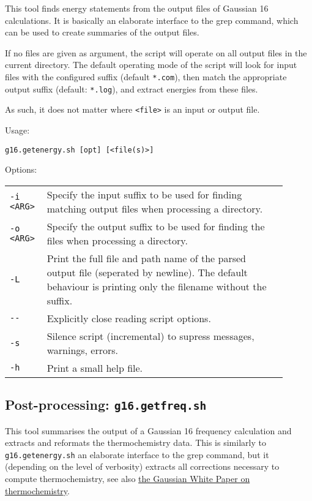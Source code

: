 \documentclass[   %
  final,          %
  a4paper         %
]{article}
\begin{document}
This tool finds energy statements from the output files of Gaussian 16 calculations.
It is basically an elaborate interface to the grep command, 
which can be used to create summaries of the output files.

If no files are given as argument, the script will operate on all output files in the current directory.
The default operating mode of the script will look for input files with the configured suffix (default \texttt{*.com}),
then match the appropriate output suffix (default: \texttt{*.log}),
and extract energies from these files.

As such, it does not matter where \lstinline`<file>` is an input or output file.

Usage: 

\lstinline`g16.getenergy.sh [opt] [<file(s)>]`

Options: 

\begin{tabular}{p{0.1\linewidth}p{0.8\linewidth}}
  {\lstinline`-i <ARG>`} & Specify the input suffix to be used for finding matching output files when processing a directory. \\
  {\lstinline`-o <ARG>`} & Specify the output suffix to be used for finding the files when processing a directory. \\
  {\lstinline`-L`}       & Print the full file and path name of the parsed output file (seperated by newline). 
    The default behaviour is printing only the filename without the suffix. \\
  {\lstinline`--`}       & Explicitly close reading script options. \\
  {\lstinline`-s`}       & Silence script (incremental) to supress messages, warnings, errors. \\
  {\lstinline`-h`}       & Print a small help file. \\
\end{tabular}

\subsection{Post-processing: \texorpdfstring{{\lstinline`g16.getfreq.sh`}}{g16.getfreq.sh}}
\label{sec:g16.getfreq}

This tool summarises the output of a Gaussian 16 frequency calculation 
and extracts and reformats the thermochemistry data.
This is similarly to \lstinline`g16.getenergy.sh` an elaborate interface to the grep command,
but it (depending on the level of verbosity) extracts all corrections necessary 
to compute thermochemistry, see also 
\href{http://gaussian.com/thermo/}{the Gaussian White Paper on thermochemistry}.
\end{document}
